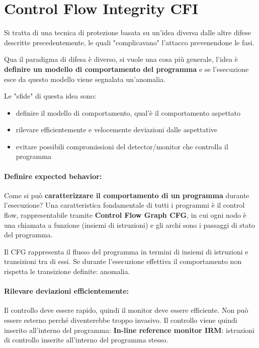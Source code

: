 \section{Control Flow Integrity CFI}
\label{sec:cfi}

Si tratta di una tecnica di protezione basata su un'idea diversa dalle altre difese descritte precedentemente, le quali "complicavano" l'attacco prevenendone le fasi. 

Qua il paradigma di difesa è diverso, si vuole una cosa più generale, l'idea è \textbf{definire un modello di comportamento del programma} e se l'esecuzione esce da questo modello viene segnalata un'anomalia.

Le "sfide" di questa idea sono: 
\begin{itemize}
	\item definire il modello di comportamento, qual'è il comportamento aspettato
	
    \item rilevare efficientemente e velocemente deviazioni dalle aspettative
	
    \item evitare possibili compromissioni del detector/monitor che controlla il programma
\end{itemize}

\paragraph{Definire expected behavior:} Come si può \textbf{caratterizzare il comportamento di un programma} durante l'esecuzione? Una caratteristica fondamentale di tutti i programmi è il control flow, rappresentabile tramite \textbf{Control Flow Graph CFG}, in cui ogni nodo è una chiamata a funzione (insiemi di istruzioni) e gli archi sono i passaggi di stato del programma. 

Il CFG rappresenta il flusso del programma in termini di insiemi di istruzioni e transizioni tra di essi. Se durante l'esecuzione effettiva il comportamento non rispetta le transizione definite: anomalia.

\paragraph{Rilevare deviazioni efficientemente:} Il controllo deve essere rapido, quindi il monitor deve essere efficiente. Non può essere esterno perché diventerebbe troppo invasivo. Il controllo viene quindi inserito all'interno del programma: \textbf{In-line reference monitor IRM}: istruzioni di controllo inserite all'interno del programma stesso. 

